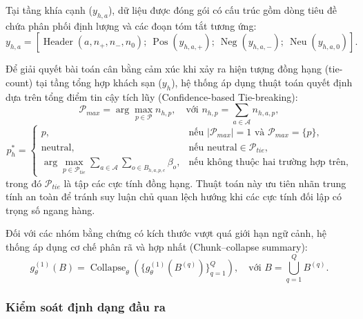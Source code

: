 Tại tầng khía cạnh ($y_{h,a}$), dữ liệu được đóng gói có cấu trúc gồm dòng tiêu đề chứa phân phối định lượng và các đoạn tóm tắt tương ứng:
\begin{equation}
y_{h,a} = \left[ \operatorname{Header}(a, n_{+}, n_{-}, n_{0});\ \operatorname{Pos}(y_{h,a,+});\ \operatorname{Neg}(y_{h,a,-});\ \operatorname{Neu}(y_{h,a,0}) \right].
\label{eq:method1-structured-aspect-summary}
\end{equation}

Để giải quyết bài toán cân bằng cảm xúc khi xảy ra hiện tượng đồng hạng (tie-count) tại tầng tổng hợp khách sạn ($y_h$), hệ thống áp dụng thuật toán quyết định dựa trên tổng điểm tin cậy tích lũy (Confidence-based Tie-breaking):
\begin{equation}
\mathcal{P}_{max} = \arg\max_{p \in \mathcal{P}} n_{h,p}, \quad \text{với } n_{h,p} = \sum_{a\in\mathcal{A}} n_{h,a,p},
\label{eq:method1-pmax-set}
\end{equation}
\begin{equation}
p_h^{*} = \begin{cases}
p, & \text{nếu } |\mathcal{P}_{max}| = 1 \text{ và } \mathcal{P}_{max} = \{p\}, \\
\mathrm{neutral}, & \text{nếu } \mathrm{neutral} \in \mathcal{P}_{tie}, \\
\arg\max_{p \in \mathcal{P}_{tie}} \sum_{a\in\mathcal{A}} \sum_{o \in B_{h,a,p,c}} \beta_o, & \text{nếu không thuộc hai trường hợp trên},
\end{cases}
\label{eq:method1-hotel-tie-breaking}
\end{equation}
trong đó $\mathcal{P}_{tie}$ là tập các cực tính đồng hạng. Thuật toán này ưu tiên nhãn trung tính an toàn để tránh suy luận chủ quan lệch hướng khi các cực tính đối lập có trọng số ngang hàng.

Đối với các nhóm bằng chứng có kích thước vượt quá giới hạn ngữ cảnh, hệ thống áp dụng cơ chế phân rã và hợp nhất (Chunk--collapse summary):
\begin{equation}
g^{(1)}_{\theta}(B) = \operatorname{Collapse}_{\theta} \left( \{g^{(1)}_{\theta}(B^{(q)})\}_{q=1}^{Q} \right), \quad \text{với } B=\bigcup_{q=1}^{Q}B^{(q)}.
\label{eq:method1-chunk-collapse}
\end{equation}

\subsubsection{Kiểm soát định dạng đầu ra}
\label{subsubsec:method1-output-format-control}

